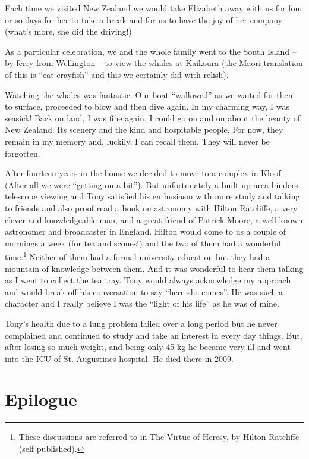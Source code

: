 Each time we visited New Zealand we would take Elizabeth away with us
for four or so days for her to take a break and for us to have the joy
of her company (what's more, she did the driving!)

As a particular celebration, we and the whole family went to the South
Island -- by ferry from Wellington -- to view the whales at Kaikoura
(the Maori translation of this is ``eat crayfish'' and this we
certainly did with relish).

Watching the whales was fantastic. Our boat ``wallowed'' as we waited
for them to surface, proceeded to blow and then dive again. In my
charming way, I was seasick! Back on land, I was fine again. I could
go on and on about the beauty of New Zealand. Its scenery and the kind
and hospitable people. For now, they remain in my memory and, luckily,
I can recall them. They will never be forgotten.

After fourteen years in the house we decided to move to a complex in
Kloof. (After all we were ``getting on a bit''). But unfortunately a
built up area hinders telescope viewing and Tony satisfied his
enthusiasm with more study and talking to friends and also proof read
a book on astronomy with Hilton Ratcliffe, a very clever and
knowledgeable man, and a great friend of Patrick Moore, a well-known
astronomer and broadcaster in England. Hilton would come to us a
couple of mornings a week (for tea and scones!) and the two of them
had a wonderful time.\footnote{These discussions are referred to in
  The Virtue of Heresy, by Hilton Ratcliffe (self published).} Neither
of them had a formal university education but they had a mountain of
knowledge between them. And it was wonderful to hear them talking as I
went to collect the tea tray.  Tony would always acknowledge my
approach and would break off his conversation to say ``here she
comes''. He was such a character and I really believe I was the
``light of his life'' as he was of mine.

Tony's health due to a lung problem failed over a long period but he
never complained and continued to study and take an interest in every
day things. But, after losing so much weight, and being only 45 kg he
became very ill and went into the ICU of St. Augustines hospital. He
died there in 2009.

\clearpage
\thispagestyle{empty}


\chapter{Epilogue}

